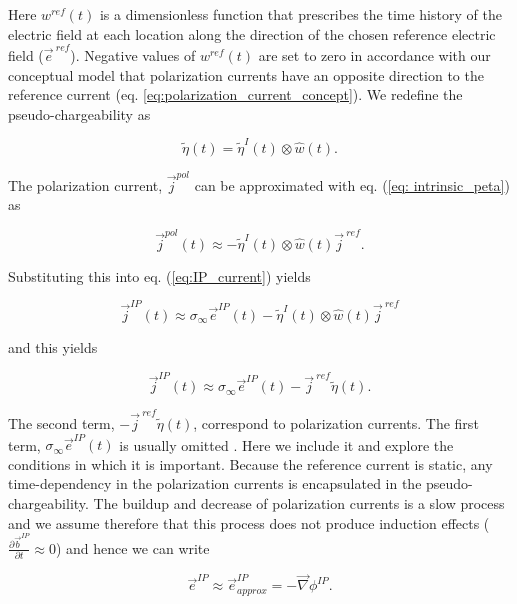 \documentclass[extra,mreferee]{gji}
\newcommand{\grad}{\vec \nabla}
\newcommand{\siginf}{\sigma_\infty}
\renewcommand {\j}  { {\vec j} }
\renewcommand {\b}  { {\vec b} }
\newcommand {\e}  { {\vec e} }
\newcommand{\peta}{\tilde{\eta}}
\newcommand{\eref}{\e^{\ ref}}
\newcommand{\jref}{\j^{\ ref}}
\begin{document}
Here $w^{ref}(t)$ is a dimensionless function that prescribes the time history of the electric field at each location along the direction of the chosen reference electric field ($\eref$).  Negative values of  $w^{ref}(t)$ are set to zero in accordance with our conceptual model that polarization currents have an opposite direction to the reference current (eq. \ref{eq:polarization_current_concept}).
We redefine the pseudo-chargeability as
\begin{linenomath*}
\begin{equation}
    \peta(t) = \peta^{I}(t)\otimes \hat{w}(t).
    \label{eq: pseudochargeability}
\end{equation}
\end{linenomath*}
The polarization current, $\j^{pol}$ can be approximated with eq. (\ref{eq: intrinsic_peta}) as
\begin{linenomath*}
\begin{equation}
  \j^{pol}(t) \approx - \peta^{I}(t)\otimes \hat{w}(t)\jref.
\end{equation}
\end{linenomath*}
Substituting this into eq. (\ref{eq:IP_current}) yields
\begin{linenomath*}
\begin{equation}
  \j^{IP}(t) \approx \siginf\e^{IP}(t) - \peta^{I}(t)\otimes \hat{w}(t)\jref
\end{equation}
\end{linenomath*}
and this yields
\begin{linenomath*}
\begin{equation}
  \j^{IP}(t) \approx \siginf\e^{IP}(t) -\jref\peta(t).
  \label{eq: jip_EMIP}
\end{equation}
\end{linenomath*}

The second term, $-\jref\peta(t)$, correspond to polarization currents. The first term, $\siginf \e^{IP}(t)$ is usually omitted \cite[]{Smith1988a}. Here we include it and explore the conditions in which it is important. 
Because the reference current is static, any time-dependency in the polarization currents is encapsulated in the pseudo-chargeability. The buildup and decrease of polarization currents is a slow process and we assume therefore that this process does not produce induction effects ($\frac{\partial \b^{IP}}{\partial t} \approx 0$) and hence we can write 
\begin{linenomath*}
\begin{equation}
  \e^{IP} \approx  \e^{IP}_{approx} = -\grad\phi^{IP}.
  \label{eq: eip_approx}
\end{equation}
\end{linenomath*}
\end{document}
